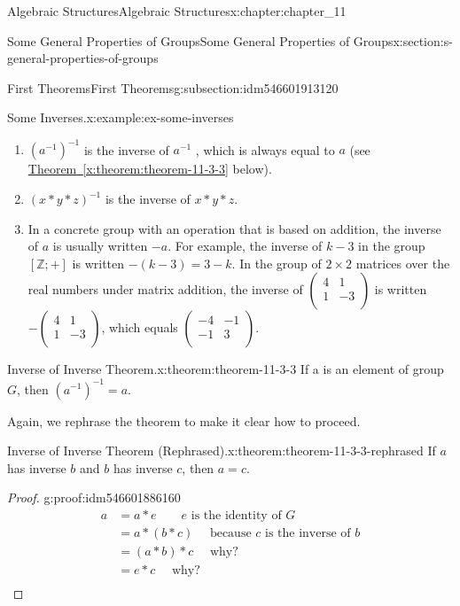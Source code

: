 \documentclass[oneside,10pt,]{book}
\newcommand{\xreffont}{\relax}
\numberwithin{equation}{section}
\begin{document}
\begin{chapterptx}{Algebraic Structures}{}{Algebraic Structures}{}{}{x:chapter:chapter_11}
\begin{sectionptx}{Some General Properties of Groups}{}{Some General Properties of Groups}{}{}{x:section:s-general-properties-of-groups}
\begin{subsectionptx}{First Theorems}{}{First Theorems}{}{}{g:subsection:idm546601913120}
\begin{example}{Some Inverses.}{x:example:ex-some-inverses}
\begin{enumerate}[label=(\alph*)]
\item{}\(\left(a^{-1}\right)^{-1}\) is the inverse of \(a^{-1}\) , which is always equal to \(a\) (see \hyperref[x:theorem:theorem-11-3-3]{Theorem~{\xreffont\ref{x:theorem:theorem-11-3-3}}} below).%
\item{}\((x*y*z)^{-1}\) is the inverse of \(x * y * z\).%
\item{}In a concrete group with an operation that is based on addition, the inverse of \(a\) is usually written \(-a\). For example, the inverse of \(k - 3\) in the group \([\mathbb{Z}; +]\) is written \(-(k- 3)=3-k\). In the group of \(2 \times 2 \) matrices over the real numbers under matrix addition, the inverse of \(\left(
\begin{array}{cc}
4 & 1 \\
1 & -3  \\
\end{array}
\right)\) is written \(-\left(
\begin{array}{cc}
4 & 1 \\
1 & -3  \\
\end{array}
\right)\), which equals \(\left(
\begin{array}{cc}
-4 & -1 \\
-1 & 3  \\
\end{array}
\right)\).%
\end{enumerate}
%
\end{example}
\begin{theorem}{Inverse of Inverse Theorem.}{}{x:theorem:theorem-11-3-3}%
If a is an element of group \(G\), then \(\left(a^{-1}\right)^{-1}=a\).%
\end{theorem}
Again, we rephrase the theorem to make it clear how to proceed.%
\begin{theorem}{Inverse of Inverse Theorem (Rephrased).}{}{x:theorem:theorem-11-3-3-rephrased}%
If \(a\) has inverse \(b\) and \(b\) has inverse \(c\), then \(a = c\).%
\end{theorem}
\begin{proof}{}{g:proof:idm546601886160}
%
\begin{equation*}
\begin{split}
a  &=a*e \quad \quad e\textrm{ is the identity of }G\\
&= a * (b * c) \quad\textrm{ because }c\textrm{ is the inverse of } b\\
& = (a * b) * c \quad \textrm{  why?}\\
& = e * c \quad \textrm{  why?}\\

\end{split}
\end{equation*}
\end{proof}
\end{subsectionptx}
\end{sectionptx}
\end{chapterptx}
\end{document}
